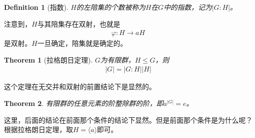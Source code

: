 \documentclass[12pt,a4paper,UTF8]{ctexbook}
\theoremstyle{plain}
\newtheorem{theorem}{\indent Theorem}[section]
\newtheorem{definition}{\indent Definition}[section]
\begin{document}
\begin{definition}[指数]
    $H$的左陪集的个数被称为$H$在$G$中的指数，记为$|G:H|$。
\end{definition}
注意到，$H$与其陪集存在双射，也就是
\begin{align*}
    \varphi:H\to aH 
\end{align*}
是双射。$H$一旦确定，陪集就是确定的。
\begin{theorem}[拉格朗日定理]
    $G$为有限群，$H\leq G$，则
    \begin{align*} 
        |G| = |G:H||H|
    \end{align*} 
\end{theorem}
这个定理在无交并和双射的前置结论下是显然的。
\begin{theorem}
    有限群的任意元素的阶整除群的阶，即$a^{|G|} = e$。
\end{theorem}
这里，后面的结论在前面那个条件的结论下显然。但是前面那个条件是为什么呢？根据拉格朗日定理，取$H = \langle a\rangle$即可。
\end{document}
